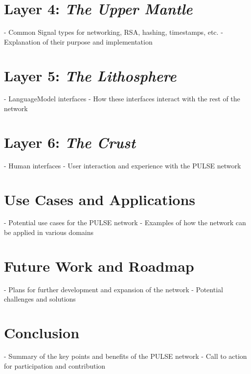 \documentclass{article}
\begin{document}
\section{Layer 4: \textit{The Upper Mantle}}
- Common Signal types for networking, RSA, hashing, timestamps, etc.
- Explanation of their purpose and implementation

\section{Layer 5: \textit{The Lithosphere}}
- LanguageModel interfaces
- How these interfaces interact with the rest of the network

\section{Layer 6: \textit{The Crust}}
- Human interfaces
- User interaction and experience with the PULSE network

\section{Use Cases and Applications}
- Potential use cases for the PULSE network
- Examples of how the network can be applied in various domains

\section{Future Work and Roadmap}
- Plans for further development and expansion of the network
- Potential challenges and solutions

\section{Conclusion}
- Summary of the key points and benefits of the PULSE network
- Call to action for participation and contribution



\end{document}
